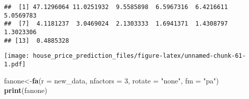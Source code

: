 \documentclass[
]{article}
\newenvironment{Shaded}{\begin{snugshade}}{\end{snugshade}}
\newcommand{\DataTypeTok}[1]{\textcolor[rgb]{0.13,0.29,0.53}{#1}}
\newcommand{\DecValTok}[1]{\textcolor[rgb]{0.00,0.00,0.81}{#1}}
\newcommand{\KeywordTok}[1]{\textcolor[rgb]{0.13,0.29,0.53}{\textbf{#1}}}
\newcommand{\NormalTok}[1]{#1}
\newcommand{\OperatorTok}[1]{\textcolor[rgb]{0.81,0.36,0.00}{\textbf{#1}}}
\newcommand{\StringTok}[1]{\textcolor[rgb]{0.31,0.60,0.02}{#1}}
\begin{document}
\begin{verbatim}
##  [1] 47.1296064 11.0251932  9.5585898  6.5967316  6.4216611  5.0569783
##  [7]  4.1181237  3.0469024  2.1303333  1.6941371  1.4308797  1.3023306
## [13]  0.4885328
\end{verbatim}

\begin{Shaded}
\end{Shaded}

\texttt{[image: house\_price\_prediction\_files/figure-latex/unnamed-chunk-61-1.pdf]}

\begin{Shaded}
\begin{Highlighting}[]
\NormalTok{fanone<-}\KeywordTok{fa}\NormalTok{(}\DataTypeTok{r =}\NormalTok{ new_data, }\DataTypeTok{nfactors =} \DecValTok{3}\NormalTok{, }\DataTypeTok{rotate =} \StringTok{"none"}\NormalTok{, }\DataTypeTok{fm =} \StringTok{"pa"}\NormalTok{)}
\KeywordTok{print}\NormalTok{(fanone)}
\end{Highlighting}
\end{Shaded}
\end{document}

